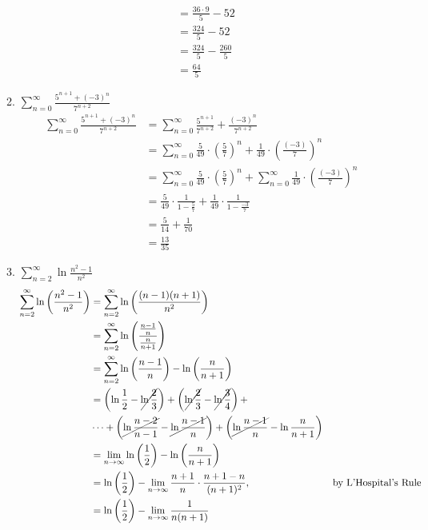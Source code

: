 \documentclass[12pt,letterpaper]{article}
\newcommand{\limx}[2]{\displaystyle\lim\limits_{#1 \to #2}}
\theoremstyle{case}
\theoremstyle{definition}
\begin{document}
\begin{enumerate}
\begin{enumerate}
\begin{align*}
				&= \frac{36 \cdot 9}{5} - 52 \\
				&= \frac{324}{5} - 52 \\
				&= \frac{324}{5} - \frac{260}{5} \\
				&= \frac{64}{5}
			\end{align*}
			\item $\displaystyle\sum_{n=0}^{\infty} \frac{5^{n+1}+(-3)^n}{7^{n+2}}$
			\begin{align*}
				\sum_{n=0}^{\infty} \frac{5^{n+1}+(-3)^n}{7^{n+2}} &= \sum_{n=0}^{\infty} \frac{5^{n+1}}{7^{n+2}}+\frac{(-3)^n}{7^{n+2}} \\
				&= \sum_{n=0}^{\infty} \frac{5}{49} \cdot \left(\frac{5}{7}\right)^n + \frac{1}{49} \cdot \left(\frac{(-3)}{7}\right)^n \\
				&= \sum_{n=0}^{\infty} \frac{5}{49} \cdot \left(\frac{5}{7}\right)^n + \sum_{n=0}^{\infty} \frac{1}{49} \cdot \left(\frac{(-3)}{7}\right)^n \\
				&= \frac{5}{49} \cdot \frac{1}{1-\frac{5}{7}} + \frac{1}{49} \cdot \frac{1}{1-\frac{-3}{7}} \\
				&= \frac{5}{14} + \frac{1}{70} \\
				&= \frac{13}{35}
			\end{align*}
			\item $\displaystyle\sum_{n=2}^{\infty} \ln \frac{n^2-1}{n^2}$
			\begin{align*}
				\sum_{n=2}^{\infty} \ln \left(\frac{n^2-1}{n^2}\right) &= \sum_{n=2}^{\infty} \ln \left(\frac{(n-1)(n+1)}{n^2}\right) \\
				&= \sum_{n=2}^{\infty} \ln \left(\frac{\frac{n-1}{n}}{\frac{n}{n+1}}\right) \\
				&= \sum_{n=2}^{\infty} \ln \left(\frac{n-1}{n}\right) - \ln\left(\frac{n}{n+1}\right) \\
				&= \left(\ln \frac{1}{2} - \cancel{\ln \frac{2}{3}}\right) + \left(\cancel{\ln \frac{2}{3}} - \cancel{\ln \frac{3}{4}}\right) +\\
				&\dots + \left(\cancel{\ln \frac{n-2}{n-1}}-\cancel{\ln \frac{n-1}{n}}\right) + \left(\cancel{\ln \frac{n-1}{n}}-\ln \frac{n}{n+1}\right) \\
				&= \limx{n}{\infty} \ln \left(\frac{1}{2}\right) - \ln \left(\frac{n}{n+1}\right) \\
				&= \ln \left(\frac{1}{2}\right) - \limx{n}{\infty} \frac{n+1}{n} \cdot \frac{n+1-n}{(n+1)^2}, &\text{by L'Hospital's Rule} \\
				&= \ln \left(\frac{1}{2}\right) - \limx{n}{\infty} \frac{1}{n(n+1)} \\

\end{align*}
\end{enumerate}
\end{enumerate}
\end{document}
